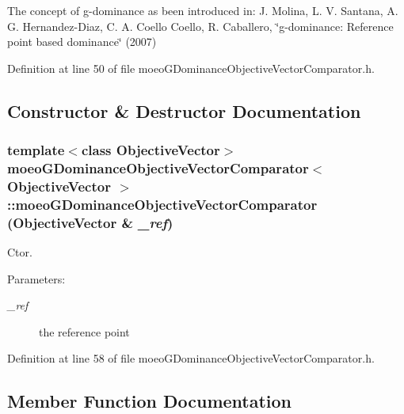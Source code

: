 The concept of g-dominance as been introduced in: J. Molina, L. V. Santana, A. G. Hernandez-Diaz, C. A. Coello Coello, R. Caballero, \char`\"{}g-dominance: Reference point based dominance\char`\"{} (2007) 



Definition at line 50 of file moeo\-GDominance\-Objective\-Vector\-Comparator.h.

\subsection{Constructor \& Destructor Documentation}
\subsubsection{\setlength{\rightskip}{0pt plus 5cm}template$<$class Objective\-Vector$>$ \bf{moeo\-GDominance\-Objective\-Vector\-Comparator}$<$ Objective\-Vector $>$::\bf{moeo\-GDominance\-Objective\-Vector\-Comparator} (Objective\-Vector \& {\em \_\-ref})\hspace{0.3cm}{\tt  [inline]}}\label{classmoeoGDominanceObjectiveVectorComparator_fc4e1f1201b6420d206b28ab98e9ea0d}


Ctor. 

\begin{Desc}
\item[Parameters:]
\begin{description}
\item[{\em \_\-ref}]the reference point \end{description}
\end{Desc}


Definition at line 58 of file moeo\-GDominance\-Objective\-Vector\-Comparator.h.

\subsection{Member Function Documentation}
